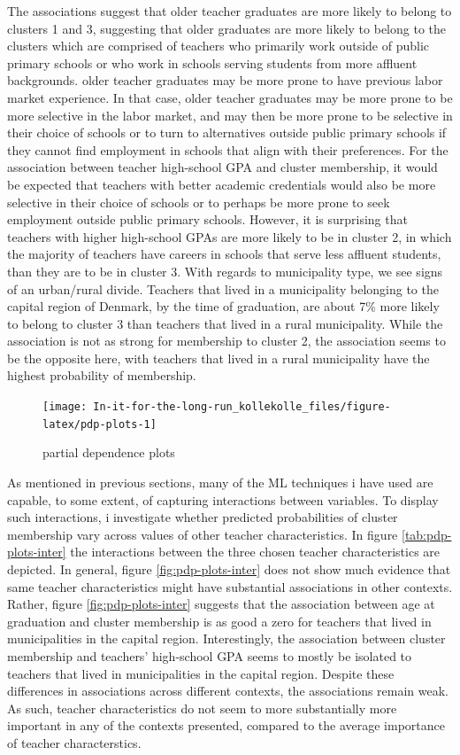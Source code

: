 \documentclass[
]{article}
\begin{document}
The associations suggest that older teacher graduates are more likely to belong to clusters 1 and 3, suggesting that older graduates are more likely to belong to the clusters which are comprised of teachers who primarily work outside of public primary schools or who work in schools serving students from more affluent backgrounds. older teacher graduates may be more prone to have previous labor market experience. In that case, older teacher graduates may be more prone to be more selective in the labor market, and may then be more prone to be selective in their choice of schools or to turn to alternatives outside public primary schools if they cannot find employment in schools that align with their preferences.
For the association between teacher high-school GPA and cluster membership, it would be expected that teachers with better academic credentials would also be more selective in their choice of schools or to perhaps be more prone to seek employment outside public primary schools. However, it is surprising that teachers with higher high-school GPAs are more likely to be in cluster 2, in which the majority of teachers have careers in schools that serve less affluent students, than they are to be in cluster 3.
With regards to municipality type, we see signs of an urban/rural divide. Teachers that lived in a municipality belonging to the capital region of Denmark, by the time of graduation, are about 7\% more likely to belong to cluster 3 than teachers that lived in a rural municipality. While the association is not as strong for membership to cluster 2, the association seems to be the opposite here, with teachers that lived in a rural municipality have the highest probability of membership.

\begin{figure}[H]
\texttt{[image: In-it-for-the-long-run\_kollekolle\_files/figure-latex/pdp-plots-1]} \caption{partial dependence plots}\label{fig:pdp-plots}
\end{figure}

As mentioned in previous sections, many of the ML techniques i have used are capable, to some extent, of capturing interactions between variables. To display such interactions, i investigate whether predicted probabilities of cluster membership vary across values of other teacher characteristics. In figure \ref{tab:pdp-plots-inter} the interactions between the three chosen teacher characteristics are depicted. In general, figure \ref{fig:pdp-plots-inter} does not show much evidence that same teacher characteristics might have substantial associations in other contexts. Rather, figure \ref{fig:pdp-plots-inter} suggests that the association between age at graduation and cluster membership is as good a zero for teachers that lived in municipalities in the capital region. Interestingly, the association between cluster membership and teachers' high-school GPA seems to mostly be isolated to teachers that lived in municipalities in the capital region. Despite these differences in associations across different contexts, the associations remain weak. As such, teacher characteristics do not seem to more substantially more important in any of the contexts presented, compared to the average importance of teacher characterstics.
\end{document}
